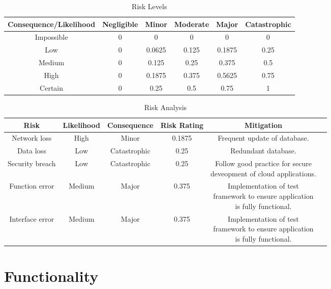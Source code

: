 \begin{table}
    \centering
    \begin{tabular}{|c||c|c|c|c|c|}
        \hline
        Consequence/Likelihood & Negligible & Minor & Moderate & Major & Catastrophic\\
        \hline
        \hline
        Impossible & 0 & 0 & 0 & 0 & 0\\
        \hline
        Low & 0 & 0.0625 & 0.125 & 0.1875 & 0.25\\
        \hline
        Medium & 0 & 0.125 & 0.25 & 0.375 & 0.5\\
        \hline
        High & 0 & 0.1875 & 0.375 & 0.5625 & 0.75\\
        \hline
        Certain & 0 & 0.25 & 0.5 & 0.75 & 1\\
        \hline
    \end{tabular}
    \caption{Risk Levels}
\end{table}

\begin{table}
    \centering
    \begin{tabular}{|c|c|c|c|c|c|}
        \hline
        Risk & Likelihood & Consequence & Risk Rating & Mitigation\\
        \hline
        \hline
        Network loss & High & Minor & 0.1875 & Frequent update of database.\\
        \hline
        Data loss & Low & Catastrophic & 0.25 & Redundant database.\\
        \hline
        Security breach & Low & Catastrophic & 0.25 & \makecell{Follow good practice for secure\\deveopment of cloud applications.}\\
        \hline
        Function error & Medium & Major & 0.375 & \makecell{Implementation of test\\framework to ensure application\\is fully functional.}\\
        \hline
        Interface error & Medium & Major & 0.375 & \makecell{Implementation of test\\framework to ensure application\\is fully functional.}\\
        \hline
    \end{tabular}
    \caption{Risk Analysis}
\end{table}

\section{Functionality}


